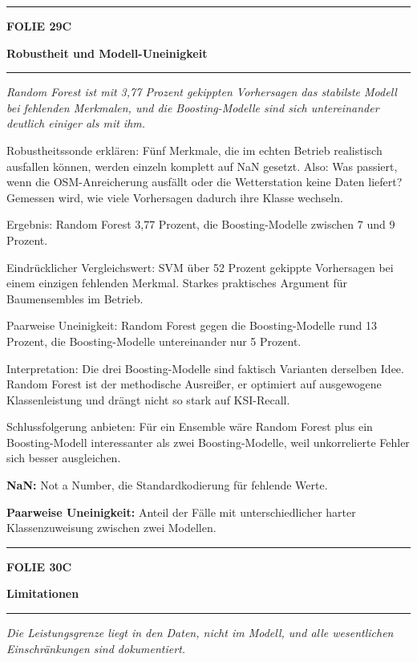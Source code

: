 \documentclass[9pt]{extarticle}
\newcommand{\karte}[3]{%
  \clearpage
  {\color{Accent}\rule{\linewidth}{2.4pt}}\par\vspace{2.5pt}
  {\fontsize{8}{9}\selectfont\bfseries\color{Accent}%
   FOLIE #1\hspace{1.2em}\textbar\hspace{1.2em}#2}\par\vspace{1pt}
  {\fontsize{16}{18}\selectfont\bfseries\color{AccentDark}#3}\par\vspace{3pt}
  {\color{Accent!45}\rule{\linewidth}{0.5pt}}\par\vspace{4pt}%
}
\newcommand{\rubrik}[1]{%
  \vspace{3.5pt}{\fontsize{7.5}{8.5}\selectfont\bfseries\color{Grau}%
  \MakeUppercase{#1}}\par\vspace{1.5pt}}
\newcommand{\kernsatz}[1]{%
  \begin{tcolorbox}[enhanced,sharp corners,boxrule=0pt,
    leftrule=2.2pt,colframe=Accent,colback=AccentPale,
    left=5pt,right=5pt,top=3.5pt,bottom=3.5pt,before skip=1pt,after skip=2pt]
    \color{AccentDark}\itshape #1
  \end{tcolorbox}}
\newcommand{\bg}[2]{\item \textbf{#1:} #2}
\begin{document}
\karte{29}{C}{Robustheit und Modell-Uneinigkeit}

\kernsatz{Random Forest ist mit 3,77 Prozent gekippten Vorhersagen das stabilste Modell bei
fehlenden Merkmalen, und die Boosting-Modelle sind sich untereinander deutlich einiger als mit ihm.}

\rubrik{Sagen}
\begin{sag}
  \item Robustheitssonde erklären: Fünf Merkmale, die im echten Betrieb realistisch ausfallen
        können, werden einzeln komplett auf NaN gesetzt. Also: Was passiert, wenn die
        OSM-Anreicherung ausfällt oder die Wetterstation keine Daten liefert? Gemessen wird,
        wie viele Vorhersagen dadurch ihre Klasse wechseln.
  \item Ergebnis: Random Forest 3,77 Prozent, die Boosting-Modelle zwischen 7 und 9 Prozent.
  \item Eindrücklicher Vergleichswert: SVM über 52 Prozent gekippte Vorhersagen bei einem
        einzigen fehlenden Merkmal. Starkes praktisches Argument für Baumensembles im Betrieb.
  \item Paarweise Uneinigkeit: Random Forest gegen die Boosting-Modelle rund 13 Prozent,
        die Boosting-Modelle untereinander nur 5 Prozent.
  \item Interpretation: Die drei Boosting-Modelle sind faktisch Varianten derselben Idee. Random
        Forest ist der methodische Ausreißer, er optimiert auf ausgewogene Klassenleistung und
        drängt nicht so stark auf KSI-Recall.
  \item Schlussfolgerung anbieten: Für ein Ensemble wäre Random Forest plus ein Boosting-Modell
        interessanter als zwei Boosting-Modelle, weil unkorrelierte Fehler sich besser ausgleichen.
\end{sag}

\rubrik{Begriffe}
\begin{begriff}
  \bg{NaN}{Not a Number, die Standardkodierung für fehlende Werte.}
  \bg{Paarweise Uneinigkeit}{Anteil der Fälle mit unterschiedlicher harter Klassenzuweisung
      zwischen zwei Modellen.}
\end{begriff}

\karte{30}{C}{Limitationen}

\kernsatz{Die Leistungsgrenze liegt in den Daten, nicht im Modell, und alle wesentlichen
Einschränkungen sind dokumentiert.}
\end{document}
